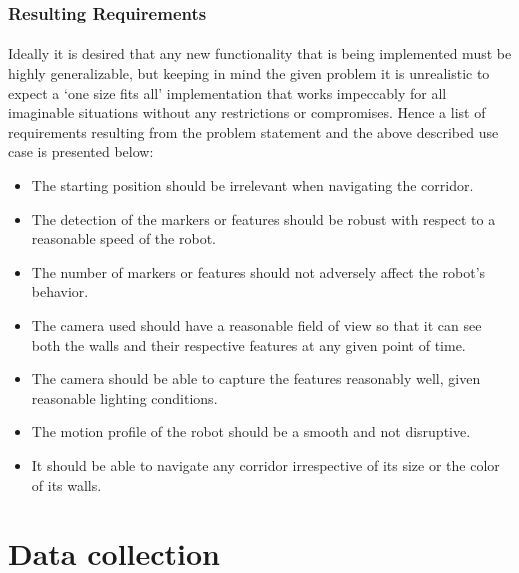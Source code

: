 \subsubsection*{Resulting Requirements}
\paragraph{} Ideally it is desired that any new functionality that is being implemented must be highly generalizable, but keeping in mind the given problem it is unrealistic to expect a `one size fits all' implementation that works impeccably for all imaginable situations without any restrictions or compromises. Hence a list of requirements resulting from the problem statement and the above described use case is presented below:

\begin{itemize}
	\item The starting position should be irrelevant when navigating the corridor.
	
	\item The detection of the markers or features should be robust with respect to a reasonable speed of the robot.
	
	\item The number of markers or features should not adversely affect the robot's behavior. 
	
	\item The camera used should have a reasonable field of view so that it can see both the walls and their respective features at any given point of time.
	
	\item The camera should be able to capture the features reasonably well, given reasonable lighting conditions.
	
	\item The motion profile of the robot should be a smooth and not disruptive. 
	
	\item It should be able to navigate any corridor irrespective of its size or the color of its walls.
\end{itemize}

\section{Data collection}
